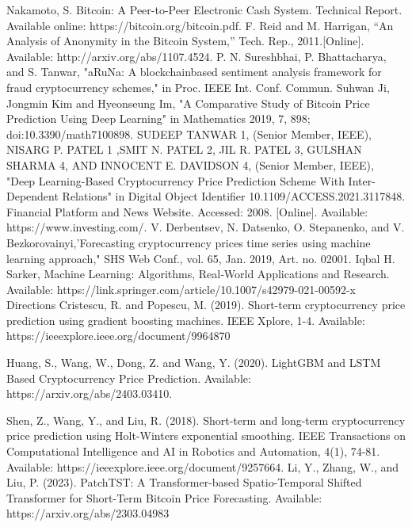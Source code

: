 \documentclass[conference]{IEEEtran}
\begin{document}
\clearpage
\begin{thebibliography}{00}
 Nakamoto, S. Bitcoin: A Peer-to-Peer Electronic Cash System. Technical Report. Available online: https://bitcoin.org/bitcoin.pdf.
 F. Reid and M. Harrigan, “An Analysis of Anonymity in the Bitcoin System,” Tech. Rep., 2011.[Online]. Available: http://arxiv.org/abs/1107.4524.
 P. N. Sureshbhai, P. Bhattacharya, and S. Tanwar, "aRuNa: A blockchainbased sentiment analysis framework for fraud cryptocurrency schemes," in Proc. IEEE Int. Conf. Commun. 
 Suhwan Ji, Jongmin Kim and Hyeonseung Im, "A Comparative Study of Bitcoin Price Prediction Using Deep Learning" in Mathematics 2019, 7, 898; doi:10.3390/math7100898.
 SUDEEP TANWAR 1, (Senior Member, IEEE), NISARG P. PATEL 1
,SMIT N. PATEL 2, JIL R. PATEL 3, GULSHAN SHARMA 4, AND INNOCENT E. DAVIDSON 4, (Senior Member, IEEE), "Deep Learning-Based Cryptocurrency
Price Prediction Scheme With Inter-Dependent Relations" in Digital Object Identifier 10.1109/ACCESS.2021.3117848.
 Financial Platform and News Website. Accessed: 2008. [Online]. Available: https://www.investing.com/.
 V. Derbentsev, N. Datsenko, O. Stepanenko, and V. Bezkorovainyi,'Forecasting cryptocurrency prices time series using machine learning approach," SHS Web Conf., vol. 65, Jan. 2019, Art. no. 02001.
 Iqbal H. Sarker, Machine Learning: Algorithms, Real‑World Applications and Research. Available: https://link.springer.com/article/10.1007/s42979-021-00592-x
Directions
 Cristescu, R. and Popescu, M. (2019). Short-term cryptocurrency price prediction using gradient boosting machines. IEEE Xplore, 1-4. Available: https://ieeexplore.ieee.org/document/9964870

 Huang, S., Wang, W., Dong, Z. and Wang, Y. (2020). LightGBM and LSTM Based Cryptocurrency Price Prediction. Available: https://arxiv.org/abs/2403.03410.

 Shen, Z., Wang, Y., and Liu, R. (2018). Short-term and long-term cryptocurrency price prediction using Holt-Winters exponential smoothing. IEEE Transactions on Computational Intelligence and AI in Robotics and Automation, 4(1), 74-81. Available: https://ieeexplore.ieee.org/document/9257664.
 Li, Y., Zhang, W., and Liu, P. (2023). PatchTST: A Transformer-based Spatio-Temporal Shifted Transformer for Short-Term Bitcoin Price Forecasting. Available: https://arxiv.org/abs/2303.04983

\end{thebibliography}
\vspace{12pt}
\end{document}
